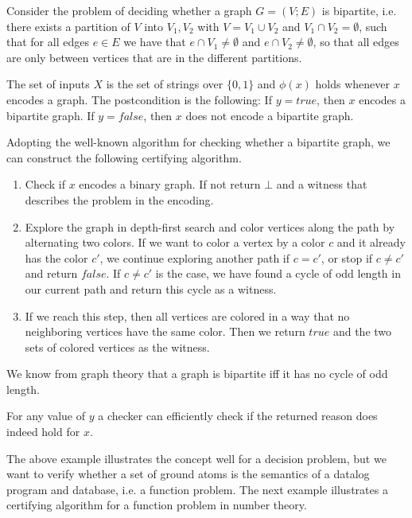 \begin{example}
    Consider the problem of deciding whether a graph $G=(V;E)$ is bipartite, i.e. there exists a partition of $V$ into $V_1, V_2$ with $V = V_1 \cup V_2$ and $V_1 \cap V_2 = \emptyset$, such that for all edges $e \in E$ we have that $e \cap V_1 \neq \emptyset$ and $e \cap V_2 \neq \emptyset$, so that all edges are only between vertices that are in the different partitions.

    The set of inputs $X$ is the set of strings over $\{0,1\}$ and $\phi(x)$ holds whenever $x$ encodes a graph. 
    The postcondition is the following: If $y= true$, then $x$ encodes a bipartite graph. If $y = false$, then $x$ does not encode a bipartite graph.

    Adopting the well-known algorithm for checking whether a bipartite graph, we can construct the following certifying algorithm.

    \begin{enumerate}
        \item Check if $x$ encodes a binary graph. If not return $\bot$ and a witness that describes the problem in the encoding.
        \item Explore the graph in depth-first search and color vertices along the path by alternating two colors. If we want to color a vertex by a color $c$ and it already has the color $c'$, we continue exploring another path if $c=c'$, or stop if $c \neq c'$ and return $false$. If $c \neq c'$ is the case, we have found a cycle of odd length in our current path and return this cycle as a witness.
        \item If we reach this step, then all vertices are colored in a way that no neighboring vertices have the same color. Then we return $true$ and the two sets of colored vertices as the witness. 
    \end{enumerate}

    We know from graph theory that a graph is bipartite iff it has no cycle of odd length.

    For any value of $y$ a checker can efficiently check if the returned reason does indeed hold for $x$.
\end{example}

The above example illustrates the concept well for a decision problem, but we want to verify whether a set of ground atoms is the semantics of a datalog program and database, i.e. a function problem. The next example illustrates a certifying algorithm for a function problem in number theory.

